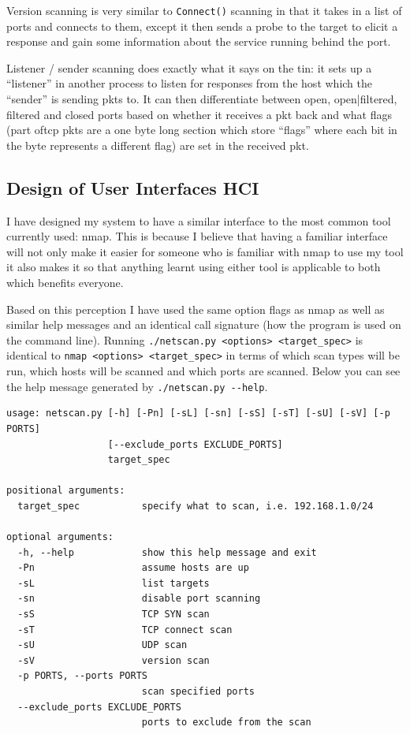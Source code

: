 \documentclass[titlepage]{article}
\let\Oldsubsection\subsection{}
\renewcommand{\subsection}{\FloatBarrier\Oldsubsection}
\begin{document}
Version scanning is very similar to \verb|Connect()| scanning in that it takes in a list of 
\glspl{port} and connects to them, except it then sends a probe to the target to elicit a response 
and gain some information about the \gls{service} running behind the \gls{port}.

Listener / sender scanning does exactly what it says on the tin: it sets up a ``listener'' in 
another process to listen for responses from the host which the ``sender'' is sending \glspl{pkt} 
to. It can then differentiate between open, open|filtered, filtered and closed \glspl{port} based on 
whether it receives a \gls{pkt} back and what flags (part of\gls{tcp} \glspl{pkt} are a one byte 
long section which store ``flags'' where each bit in the byte represents a different flag) are set 
in the received \gls{pkt}. 

\subsection{Design of User Interfaces HCI}

I have designed my system to have a similar interface to the most common tool currently used: nmap.
This is because I believe that having a familiar interface will not only make it easier for someone 
who is familiar with nmap to use my tool it also makes it so that anything learnt using either tool 
is applicable to both which benefits everyone.

Based on this perception I have used the same option flags as nmap as well as similar help messages 
and an identical call signature (how the program is used on the command line). Running 
\verb|./netscan.py <options> <target_spec>| is identical to \verb|nmap <options> <target_spec>| in 
terms of which scan types will be run, which hosts will be scanned and which \glspl{port} are 
scanned. Below you can see the help message generated by \verb|./netscan.py --help|.

\begin{verbatim}
usage: netscan.py [-h] [-Pn] [-sL] [-sn] [-sS] [-sT] [-sU] [-sV] [-p PORTS]
                  [--exclude_ports EXCLUDE_PORTS]
                  target_spec

positional arguments:
  target_spec           specify what to scan, i.e. 192.168.1.0/24

optional arguments:
  -h, --help            show this help message and exit
  -Pn                   assume hosts are up
  -sL                   list targets
  -sn                   disable port scanning
  -sS                   TCP SYN scan
  -sT                   TCP connect scan
  -sU                   UDP scan
  -sV                   version scan
  -p PORTS, --ports PORTS
                        scan specified ports
  --exclude_ports EXCLUDE_PORTS
                        ports to exclude from the scan
\end{verbatim}
\end{document}
